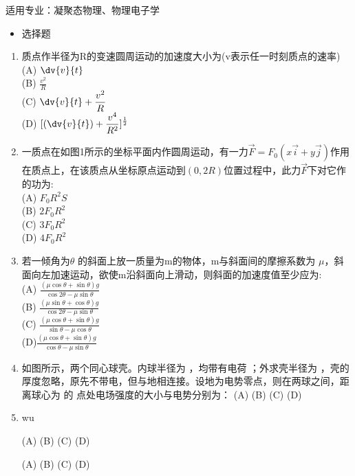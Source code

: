 适用专业：凝聚态物理、物理电子学
\begin{itemize}
\item 选择题
\end{itemize}
\begin{enumerate}
\item 质点作半径为R的变速圆周运动的加速度大小为(v表示任一时刻质点的速率)\\
(A) $\displaystyle \dv{v}{t}$\\
(B) $\displaystyle \frac{v^2}{R}$\\
(C) $\displaystyle \dv{v}{t}+\frac{v^2}{R}$\\
(D) $\displaystyle [(\dv{v}{t})+\frac{v^4}{R^2}]^\frac{1}{2}$
\item 一质点在如图1所示的坐标平面内作圆周运动，有一力$\vec F=F_0(x\vec i+y \vec j)$作用在质点上，在该质点从坐标原点运动到$(0,2R)$位置过程中，此力$\vec F$下对它作的功为:\\
(A) $F_0R^2S$\\
(B) $2F_0R^2$\\
(C) $3F_0R^2$\\
(D) $4F_0R^2$
\item 若一倾角为$\theta$ 的斜面上放一质量为m的物体，m与斜面间的摩擦系数为 $\mu$，斜面向左加速运动，欲使m沿斜面向上滑动，则斜面的加速度值至少应为:\\
(A) $\displaystyle \frac{(\mu \cos \theta+\sin \theta)g}{\cos 2\theta -\mu \sin \theta}$\\
(B) $\displaystyle\frac{(\mu \sin \theta+\cos \theta)g}{\cos 2\theta -\mu \sin \theta}$\\
(C) $\displaystyle \frac{(\mu \cos \theta+\sin \theta)g}{\sin \theta -\mu \cos\theta}$\\
(D)$\displaystyle \frac{(\mu \cos \theta+\sin \theta)g}{\cos \theta -\mu \sin\theta}$
\item 如图所示，两个同心球壳。内球半径为  ，均带有电荷  ；外求壳半径为  ，壳的厚度忽略，原先不带电，但与地相连接。设地为电势零点，则在两球之间，距离球心为  的  点处电场强度的大小与电势分别为：
(A)
(B)
(C)
(D)
\item wu

(A)
(B)
(C)
(D)


(A)
(B)
(C)
(D)
\end{enumerate}
